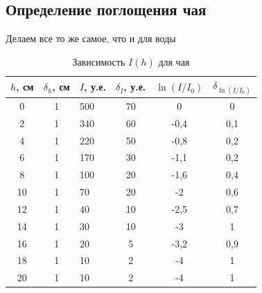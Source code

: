 \documentclass[a4paper, 12pt]{article}%
\begin{document}
\subsection*{Определение поглощения чая}
Делаем все то же самое, что и для воды
\begin{table}[h]
\begin{center}

\begin{tabular}{|c|c|l|c|c|c|}
\hline
$h$, см & $\delta_h$, см & $I$, у.е. & $\delta_I$, у.е. & $\ln(I/I_0)$ & $\delta_{\ln(I/I_0)}$ \\ \hline
0       & 1              & 500       & 70               & 0            & 0                     \\ \hline
2       & 1              & 340       & 60               & -0,4         & 0,1                   \\ \hline
4       & 1              & 220       & 50               & -0,8         & 0,2                   \\ \hline
6       & 1              & 170       & 30               & -1,1         & 0,2                   \\ \hline
8       & 1              & 100       & 20               & -1,6         & 0,4                   \\ \hline
10      & 1              & 70        & 20               & -2           & 0,6                   \\ \hline
12      & 1              & 40        & 10               & -2,5         & 0,7                   \\ \hline
14      & 1              & 30        & 10               & -3           & 1                     \\ \hline
16      & 1              & 20        & 5                & -3,2         & 0,9                   \\ \hline
18      & 1              & 10        & 2                & -4           & 1                     \\ \hline
20      & 1              & 10        & 2                & -4           & 1                     \\ \hline
\end{tabular}
\caption{Зависимость $I(h)$ для чая}
\end{center}
\end{table}
\end{document}
